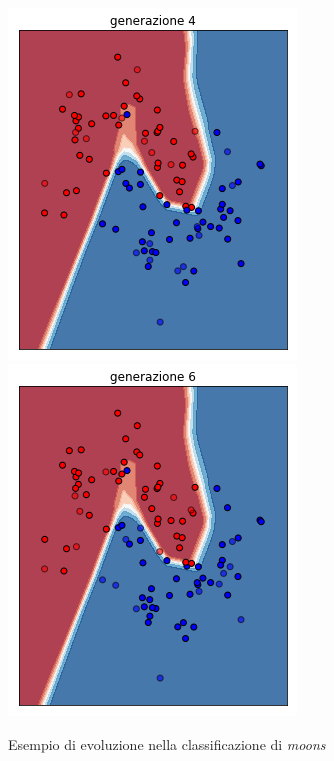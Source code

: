 \documentclass{beamer}
\begin{document}
\begin{frame}
\begin{figure}[H]
 \\
 \includegraphics[scale = 0.25]{images/moons-rnd-log./4.png}
 \includegraphics[scale = 0.25]{images/moons-rnd-log./5.png}
 \caption{Esempio di evoluzione nella classificazione di \textit{moons}}
 \end{figure}
\end{frame}
\end{document}
